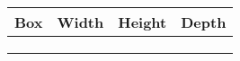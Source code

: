 \documentclass{revtex4-1}
\begin{document}
\newlength{\mylength}

\fbox{$\Sigma$}

\begin{center}
  \fboxsep=0pt
  \def\check#1{%
    \fbox{#1} &
    \settowidth{\mylength}{#1}\the\mylength &
    \settoheight{\mylength}{#1}\the\mylength &
    \settodepth{\mylength}{#1}\the\mylength}
  \begin{tabular}{c|c|c|c}
    Box & Width & Height & Depth \\ \hline\hline
    \check{$\Sigma$} \\
    \check{$\frac12+\frac34$} \\
    \check{$\dfrac12+\dfrac34$} \\
  \end{tabular}
\end{center}

\fbox{$\Sigma$}
\end{document}
